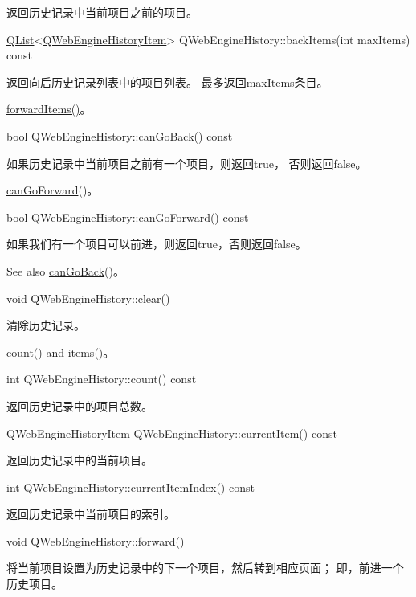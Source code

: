 返回历史记录中当前项目之前的项目。

\href{https://github.com/QtDocumentCN/QtDocumentCN/blob/master/Src/L/QList/QList.md}{QList}<\href{https://github.com/QtDocumentCN/QtDocumentCN/blob/master/Src/W/QWebEngineHistoryItem/QWebEngineHistoryItem.md}{QWebEngineHistoryItem}> QWebEngineHistory::backItems(int maxItems) const


返回向后历史记录列表中的项目列表。 最多返回maxItems条目。

\begin{notice}[另请参阅]
	\href{https://doc.qt.io/qt-5/qwebenginehistory.html#forwardItems}{forwardItems()}。

\end{notice}

bool QWebEngineHistory::canGoBack() const

如果历史记录中当前项目之前有一个项目，则返回true， 否则返回false。

\begin{notice}[另请参阅]
	\href{https://doc.qt.io/qt-5/qwebenginehistory.html#canGoForward}{canGoForward}()。
\end{notice}


bool QWebEngineHistory::canGoForward() const

如果我们有一个项目可以前进，则返回true，否则返回false。

See also \href{https://doc.qt.io/qt-5/qwebenginehistory.html#canGoBack}{canGoBack}()。

void QWebEngineHistory::clear()

清除历史记录。

\begin{notice}[另请参阅]
	\href{https://doc.qt.io/qt-5/qwebenginehistory.html#count}{count}() and \href{https://doc.qt.io/qt-5/qwebenginehistory.html#items}{items}()。

\end{notice}


int QWebEngineHistory::count() const

返回历史记录中的项目总数。

QWebEngineHistoryItem QWebEngineHistory::currentItem() const

返回历史记录中的当前项目。

int QWebEngineHistory::currentItemIndex() const

返回历史记录中当前项目的索引。

void QWebEngineHistory::forward()

将当前项目设置为历史记录中的下一个项目，然后转到相应页面； 即，前进一个历史项目。

